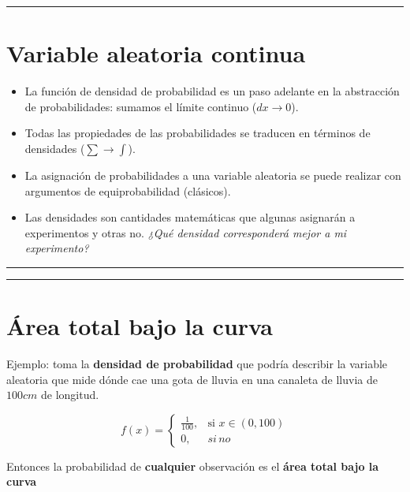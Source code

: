 \documentclass[
]{book}
\begin{document}
\begin{center}\rule{0.5\linewidth}{0.5pt}\end{center}

\hypertarget{variable-aleatoria-continua-4}{%
\section{Variable aleatoria continua}\label{variable-aleatoria-continua-4}}

\begin{itemize}
\item
  La función de densidad de probabilidad es un paso adelante en la abstracción de probabilidades: sumamos el límite continuo (\(dx \rightarrow 0\)).
\item
  Todas las propiedades de las probabilidades se traducen en términos de densidades (\(\sum \rightarrow \int\)).
\item
  La asignación de probabilidades a una variable aleatoria se puede realizar con argumentos de equiprobabilidad (clásicos).
\item
  Las densidades son cantidades matemáticas que algunas asignarán a experimentos y otras no. \emph{¿Qué densidad corresponderá mejor a mi experimento?}
\end{itemize}

\begin{center}\rule{0.5\linewidth}{0.5pt}\end{center}

\begin{center}\rule{0.5\linewidth}{0.5pt}\end{center}

\hypertarget{uxe1rea-total-bajo-la-curva}{%
\section{Área total bajo la curva}\label{uxe1rea-total-bajo-la-curva}}

Ejemplo: toma la \textbf{densidad de probabilidad} que podría describir la variable aleatoria que mide dónde cae una gota de lluvia en una canaleta de lluvia de \(100cm\) de longitud.

\[
    f(x)= 
\begin{cases}
    \frac{1}{100},& \text{si } x\in (0,100)\\
    0,& si \, no 
\end{cases}
\]

Entonces la probabilidad de \textbf{cualquier} observación es el \textbf{área total bajo la curva}
\end{document}
